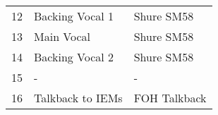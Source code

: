 {\begin{center}
\begin{tabular}{|c|p{3cm}|p{6cm}|}
            \rowcolor{vocalscolor} 12 & Backing Vocal 1             & Shure SM58               \\
            \rowcolor{vocalscolor} 13 & Main Vocal                  & Shure SM58               \\
            \rowcolor{vocalscolor} 14 & Backing Vocal 2             & Shure SM58               \\

            \rowcolor{unusedcolor} 15 & -                           & -                        \\

            \rowcolor{systemcolor} 16 & Talkback to IEMs            & FOH Talkback             \\
            \hline
        \end{tabular}
    \end{center}
}
